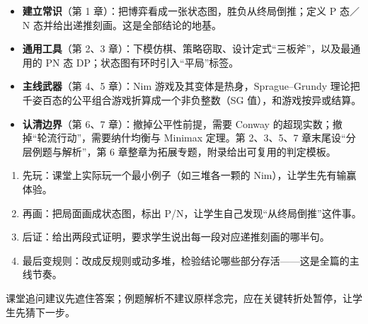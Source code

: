 \documentclass[UTF8,a4paper,11pt,oneside,openany,fontset=fandol]{ctexbook}
\theoremstyle{definition}
\begin{document}
\begin{itemize}
\item \textbf{建立常识}（第 1 章）：把博弈看成一张状态图，胜负从终局倒推；定义 P 态／N 态并给出递推刻画。这是全部结论的地基。
\item \textbf{通用工具}（第 2、3 章）：下模仿棋、策略窃取、设计定式“三板斧”，以及最通用的 PN 态 DP；状态图有环时引入“平局”标签。
\item \textbf{主线武器}（第 4、5 章）：Nim 游戏及其变体是热身，Sprague--Grundy 理论把千姿百态的公平组合游戏折算成一个非负整数（SG 值），和游戏按异或结算。
\item \textbf{认清边界}（第 6、7 章）：撤掉公平性前提，需要 Conway 的超现实数；撤掉“轮流行动”，需要纳什均衡与 Minimax 定理。第 2、3、5、7 章末尾设“分层例题与解析”，第 6 章整章为拓展专题，附录给出可复用的判定模板。
\end{itemize}

\begin{teach}[每类博弈的四步讲法]
\begin{enumerate}
\item 先玩：课堂上实际玩一个最小例子（如三堆各一颗的 Nim），让学生先有输赢体验。
\item 再画：把局面画成状态图，标出 P/N，让学生自己发现“从终局倒推”这件事。
\item 后证：给出两段式证明，要求学生说出每一段对应递推刻画的哪半句。
\item 最后变规则：改成反规则或动多堆，检验结论哪些部分存活——这是全篇的主线节奏。
\end{enumerate}
课堂追问建议先遮住答案；例题解析不建议原样念完，应在关键转折处暂停，让学生先猜下一步。
\end{teach}
\end{document}
